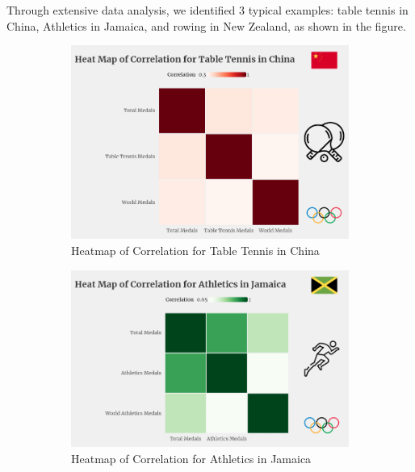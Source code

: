 \documentclass[12pt]{article}  %
\begin{document}
Through extensive data analysis, we identified 3 typical examples: table tennis in China, Athletics in Jamaica, and rowing in New Zealand, as shown in the figure.
\begin{figure}[htbp]
	\centering
	\begin{subfigure}[b]{.3\textwidth}
		\includegraphics[width=\textwidth]{img/Table Tennis.png}
		\caption{Heatmap of Correlation for Table Tennis in China}\label{subfig:1}
	\end{subfigure}
	\hfill 
	\begin{subfigure}[b]{.33\textwidth}
		\includegraphics[width=\textwidth]{img/Jamaica.png}
		\caption{ Heatmap of Correlation for Athletics in Jamaica}\label{subfig:2}
	\end{subfigure}
	\hfill 
	\begin{subfigure}[b]{.32\textwidth}

\end{subfigure}
\end{figure}
\end{document}
